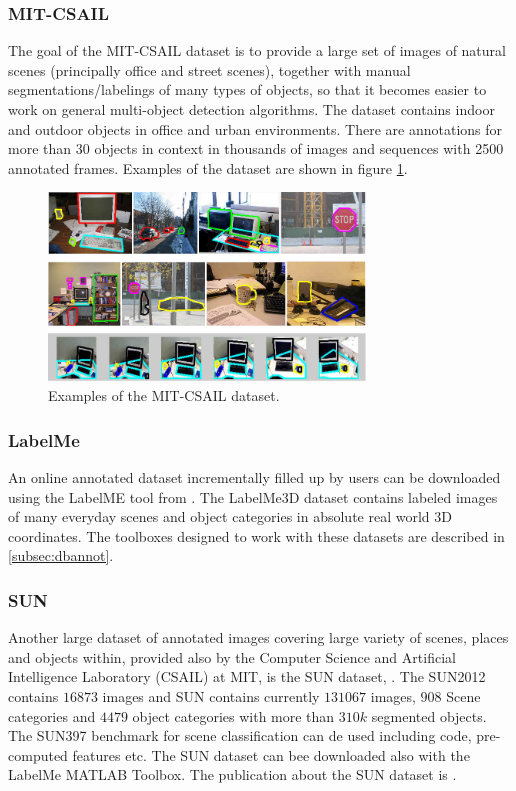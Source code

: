 \subsubsection{MIT-CSAIL}
The goal of the MIT-CSAIL dataset \cite{mit-csail_db} is to provide a large set of images of natural scenes (principally office and street scenes), together with manual segmentations/labelings of many types of objects, so that it becomes easier to work on general multi-object detection algorithms. The dataset contains indoor and outdoor objects in office and urban environments. There are annotations for more than $30$ objects in context in thousands of images and sequences with 2500 annotated frames. Examples of the dataset are shown in figure \ref{fig:mit-csail}.

\begin{figure}[H]
\begin{center}
\includegraphics[width=0.75\textwidth]{fig/MIT-CSAIL}
\end{center}
\caption{Examples of the MIT-CSAIL dataset.}
\label{fig:mit-csail}
\end{figure}

\subsubsection{LabelMe}
An online annotated dataset incrementally filled up by users can be downloaded using the LabelME tool from \cite{labelme_db}. The LabelMe3D dataset contains labeled images of many everyday scenes and object categories in absolute real world 3D coordinates. The toolboxes designed to work with these datasets are described in \ref{subsec:dbannot}.

\subsubsection{SUN}
Another large dataset of annotated images covering large variety of scenes, places and objects within, provided also by the Computer Science and Artificial Intelligence Laboratory (CSAIL) at MIT, is the SUN dataset, \cite{sun_db}. The SUN2012 contains $16 873$ images and SUN contains currently $131067$ images, $908$ Scene categories and $4479$ object categories with more than $310k$ segmented objects. The SUN397 benchmark for scene classification can de used including code, pre-computed features etc. The SUN dataset can bee downloaded also with the LabelMe MATLAB Toolbox. The publication about the SUN dataset is \cite{Xiao2010}.

